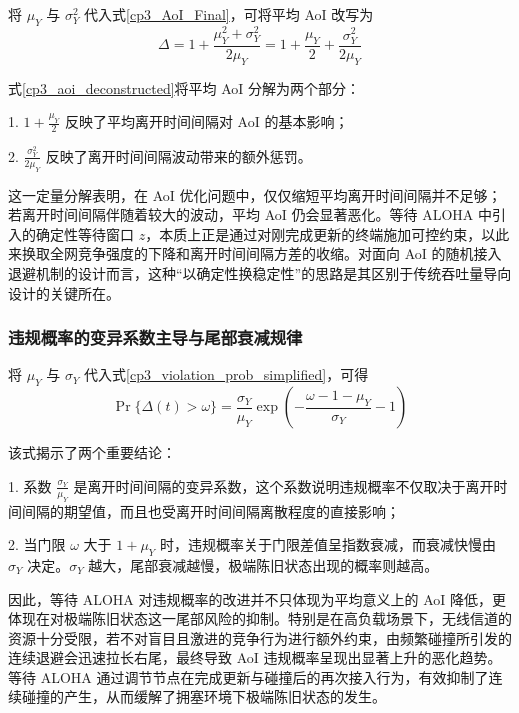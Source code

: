 将 $\mu_Y$ 与 $\sigma_Y^2$ 代入式\eqref{cp3_AoI_Final}，可将平均 AoI 改写为
\begin{equation}\label{cp3_aoi_deconstructed}
    \Delta = 1 + \frac{\mu_Y^2 + \sigma_Y^2}{2\mu_Y} = 1 + \frac{\mu_Y}{2} + \frac{\sigma_Y^2}{2\mu_Y}
\end{equation}

式\eqref{cp3_aoi_deconstructed}将平均 AoI 分解为两个部分：

1. $1 + \frac{\mu_Y}{2}$ 反映了平均离开时间间隔对 AoI 的基本影响；

2. $\frac{\sigma_Y^2}{2\mu_Y}$ 反映了离开时间间隔波动带来的额外惩罚。

这一定量分解表明，在 AoI 优化问题中，仅仅缩短平均离开时间间隔并不足够；若离开时间间隔伴随着较大的波动，平均 AoI 仍会显著恶化。等待 ALOHA 中引入的确定性等待窗口 $z$，本质上正是通过对刚完成更新的终端施加可控约束，以此来换取全网竞争强度的下降和离开时间间隔方差的收缩。对面向 AoI 的随机接入退避机制的设计而言，这种“以确定性换稳定性”的思路是其区别于传统吞吐量导向设计的关键所在。

\subsubsection{违规概率的变异系数主导与尾部衰减规律}

将 $\mu_Y$ 与 $\sigma_Y$ 代入式\eqref{cp3_violation_prob_simplified}，可得
\begin{equation}\label{cp3_violation_deconstructed}
    \Pr\{\Delta(t) > \omega\} = \frac{\sigma_Y}{\mu_Y} \exp\left( -\frac{\omega - 1 - \mu_Y}{\sigma_Y} - 1 \right)
\end{equation}

该式揭示了两个重要结论：

1. 系数 $\frac{\sigma_Y}{\mu_Y}$ 是离开时间间隔的变异系数，这个系数说明违规概率不仅取决于离开时间间隔的期望值，而且也受离开时间间隔离散程度的直接影响；

2. 当门限 $\omega$ 大于 $1+\mu_Y$ 时，违规概率关于门限差值呈指数衰减，而衰减快慢由 $\sigma_Y$ 决定。$\sigma_Y$ 越大，尾部衰减越慢，极端陈旧状态出现的概率则越高。

因此，等待 ALOHA 对违规概率的改进并不只体现为平均意义上的 AoI 降低，更体现在对极端陈旧状态这一尾部风险的抑制。特别是在高负载场景下，无线信道的资源十分受限，若不对盲目且激进的竞争行为进行额外约束，由频繁碰撞所引发的连续退避会迅速拉长右尾，最终导致 AoI 违规概率呈现出显著上升的恶化趋势。等待 ALOHA 通过调节节点在完成更新与碰撞后的再次接入行为，有效抑制了连续碰撞的产生，从而缓解了拥塞环境下极端陈旧状态的发生。


